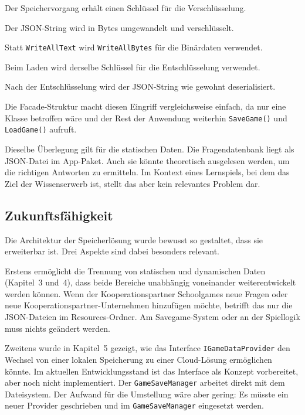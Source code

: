 \documentclass[12pt,a4paper]{article}
\begin{document}
\begin{description}[leftmargin=2em, labelwidth=1.5em]
    \item[(1)] Der Speichervorgang erhält einen Schlüssel für die Verschlüsselung.
    \item[(2)] Der JSON-String wird in Bytes umgewandelt und verschlüsselt.
    \item[(3)] Statt \texttt{WriteAllText} wird \texttt{WriteAllBytes} für die Binärdaten verwendet.
    \item[(4)] Beim Laden wird derselbe Schlüssel für die Entschlüsselung verwendet.
    \item[(5)] Nach der Entschlüsselung wird der JSON-String wie gewohnt deserialisiert.
\end{description}

Die Facade-Struktur macht diesen Eingriff vergleichsweise einfach, da nur eine Klasse betroffen wäre und der Rest der Anwendung weiterhin \texttt{SaveGame()} und \texttt{LoadGame()} aufruft.

Dieselbe Überlegung gilt für die statischen Daten. Die Fragendatenbank liegt als JSON-Datei im App-Paket. Auch sie könnte theoretisch ausgelesen werden, um die richtigen Antworten zu ermitteln. Im Kontext eines Lernspiels, bei dem das Ziel der Wissenserwerb ist, stellt das aber kein relevantes Problem dar.

\subsection{Zukunftsfähigkeit}

Die Architektur der Speicherlösung wurde bewusst so gestaltet, dass sie erweiterbar ist. Drei Aspekte sind dabei besonders relevant.

Erstens ermöglicht die Trennung von statischen und dynamischen Daten (Kapitel~3 und~4), dass beide Bereiche unabhängig voneinander weiterentwickelt werden können. Wenn der Kooperationspartner Schoolgames neue Fragen oder neue Kooperationspartner-Unternehmen hinzufügen möchte, betrifft das nur die JSON-Dateien im Resources-Ordner. Am Savegame-System oder an der Spiellogik muss nichts geändert werden.

Zweitens wurde in Kapitel~5 gezeigt, wie das Interface \texttt{IGameDataProvider} den Wechsel von einer lokalen Speicherung zu einer Cloud-Lösung ermöglichen könnte. Im aktuellen Entwicklungsstand ist das Interface als Konzept vorbereitet, aber noch nicht implementiert. Der \texttt{GameSaveManager} arbeitet direkt mit dem Dateisystem. Der Aufwand für die Umstellung wäre aber gering: Es müsste ein neuer Provider geschrieben und im \texttt{GameSaveManager} eingesetzt werden.
\end{document}
